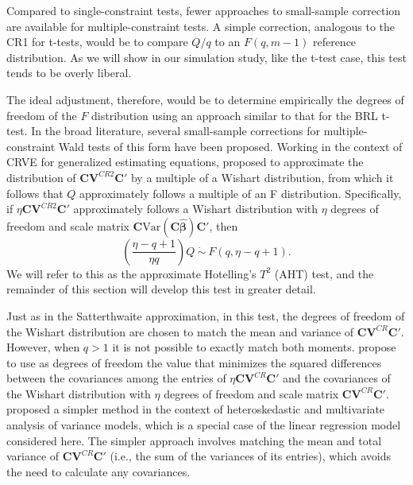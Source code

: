 \documentclass[12pt]{article}\usepackage[]{graphicx}\usepackage[]{color}
\newcommand{\Var}{\text{Var}}
\newcommand{\bm}{\mathbf}
\newcommand{\bs}{\boldsymbol}
\begin{document}
Compared to single-constraint tests, fewer approaches to small-sample correction are available for multiple-constraint tests. A simple correction, analogous to the CR1 for t-tests, would be to compare $Q / q$ to an $F(q, m - 1)$ reference distribution. As we will show in our simulation study, like the t-test case, this test tends to be overly liberal. 

The ideal adjustment, therefore, would be to determine empirically the degrees of freedom of the $F$ distribution using an approach similar to that for the BRL t-test. In the broad literature, several small-sample corrections for multiple-constraint Wald tests of this form have been proposed.  Working in the context of CRVE for generalized estimating equations, \cite{Pan2002small} proposed to approximate the distribution of $\bm{C}\bm{V}^{CR2} \bm{C}'$ by a multiple of a Wishart distribution, from which it follows that $Q$ approximately follows a multiple of an F distribution. Specifically, if $\eta \bm{C}\bm{V}^{CR2} \bm{C}'$ approximately follows a Wishart distribution with $\eta$ degrees of freedom and scale matrix $\bm{C} \Var\left(\bm{C}\bs{\hat\beta}\right)\bm{C}'$, then 
\begin{equation}
\label{eq:AHT}
\left(\frac{\eta - q + 1}{\eta q}\right) Q \ \dot\sim \ F(q, \eta - q + 1).
\end{equation}
We will refer to this as the approximate Hotelling's $T^2$ (AHT) test, and the remainder of this section will develop this test in greater detail.

Just as in the Satterthwaite approximation, in this test, the degrees of freedom of the Wishart distribution are chosen to match the mean and variance of $\bm{C}\bm{V}^{CR} \bm{C}'$. However, when $q > 1$ it is not possible to exactly match both moments. \cite{Pan2002small} propose to use as degrees of freedom the value that minimizes the squared differences between the covariances among the entries of $\eta \bm{C}\bm{V}^{CR}\bm{C}'$ and the covariances of the Wishart distribution with $\eta$ degrees of freedom and scale matrix $\bm{C}\bm{V}^{CR}\bm{C}'$. \citet{Zhang2012two-wayANOVA, Zhang2012MANOVA, Zhang2013tests} proposed a simpler method in the context of heteroskedastic and multivariate analysis of variance models, which is a special case of the linear regression model considered here. 
The simpler approach involves matching the mean and total variance of $\bm{C}\bm{V}^{CR}\bm{C}'$ (i.e., the sum of the variances of its entries), which avoids the need to calculate any covariances.
\end{document}

